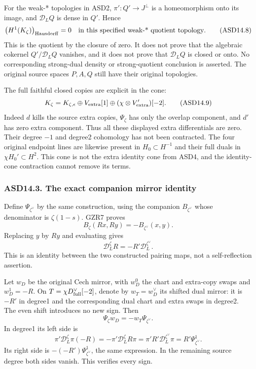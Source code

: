 For the weak-* topologies in ASD2, \(\pi':Q'\to J^\perp\) is a
homeomorphism onto its image, and \(\mathcal D_LQ\) is dense in \(Q'\).
Hence \[
 \bigl(H^1(K_\zeta)\bigr)_{\rm Hausdorff}=0
 \quad\text{in this specified weak-* quotient topology}.
 \tag{ASD14.8}
\] This is the quotient by the closure of zero. It does not prove that
the algebraic cokernel \(Q'/\mathcal D_LQ\) vanishes, and it does not
prove that \(\mathcal D_LQ\) is closed or onto. No corresponding
strong-dual density or strong-quotient conclusion is asserted. The
original source spaces \(P,A,Q\) still have their original topologies.

The full faithful closed copies are explicit in the cone: \[
 K_\zeta=K_{\zeta,\epsilon}
 \oplus V_{\rm extra}[1]
 \oplus(\chi\otimes V_{\rm extra}')[-2].
 \tag{ASD14.9}
\] Indeed \(d\) kills the source extra copies, \(\Psi_\zeta\) has only
the overlap component, and \(d'\) has zero extra component. Thus all
these displayed extra differentials are zero. Their degree \(-1\) and
degree2 cohomology has not been contracted. The four original endpoint
lines are likewise present in \(H_0\subset H^{-1}\) and their full duals
in \(\chi H_0'\subset H^2\). This cone is not the extra identity cone
from ASD4, and the identity-cone contraction cannot remove its terms.

\subsubsection{ASD14.3. The exact companion mirror
identity}\label{asd14.3.-the-exact-companion-mirror-identity}

Define \(\Psi_{\zeta^\vee}\) by the same construction, using the
companion \(B_{\zeta^\vee}\) whose denominator is \(\zeta(1-s)\). GZR7
proves \[
 B_\zeta(Rx,Ry)=-B_{\zeta^\vee}(x,y).
 \tag{ASD14.10}
\] Replacing \(y\) by \(Ry\) and evaluating gives \[
 \mathcal D_L^\zeta R=-R'\mathcal D_L^{\zeta^\vee}.
 \tag{ASD14.11}
\] This is an identity between the two constructed pairing maps, not a
self-reflection assertion.

Let \(w_D\) be the original Cech mirror, with \(w_D^0\) the chart and
extra-copy swaps and \(w_D^1=-R\). On \(T=\chi D_{\rm full}^\vee[-2]\),
denote by \(w_T=w_D^\vee\) its shifted dual mirror: it is \(-R'\) in
degree1 and the corresponding dual chart and extra swaps in degree2. The
even shift introduces no new sign. Then \[
 \boxed{\Psi_\zeta w_D=-w_T\Psi_{\zeta^\vee}.}
 \tag{ASD14.12}
\] In degree1 its left side is \[
 \pi'\mathcal D_L^\zeta\pi(-R)
 =-\pi'\mathcal D_L^\zeta R\pi
 =\pi'R'\mathcal D_L^{\zeta^\vee}\pi
 =R'\Psi_{\zeta^\vee}^1.
\] Its right side is \(-(-R')\Psi_{\zeta^\vee}^1\), the same expression.
In the remaining source degree both sides vanish. This verifies every
sign.

